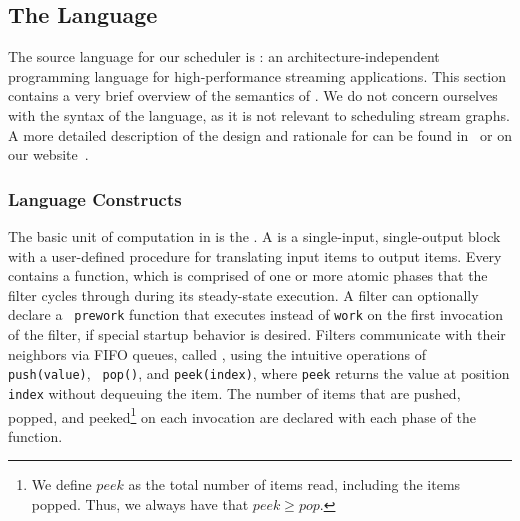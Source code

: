 \subsection{The {\StreamIt} Language}
\label{sec:streamit}

The source language for our scheduler is {\StreamIt}: an
architecture-independent programming language for high-performance
streaming applications.  This section contains a very brief overview
of the semantics of {\StreamIt}.  We do not concern ourselves with the
syntax of the language, as it is not relevant to scheduling stream
graphs. A more detailed description of the design and rationale for
{\StreamIt} can be found in~\cite{thies02streamit} or on our
website~\cite{streamitweb}.

\subsubsection{Language Constructs}

The basic unit of computation in {\StreamIt} is the {\filter}. A
{\filter} is a single-input, single-output block with a user-defined
procedure for translating input items to output items.  Every
{\filter} contains a {\work} function, which is comprised of one or
more atomic phases that the filter cycles through during its
steady-state execution. A filter can optionally declare a {\tt
prework} function that executes instead of {\tt work} on the first
invocation of the filter, if special startup behavior is desired.
Filters communicate with their neighbors via FIFO queues, called
{\Channels}, using the intuitive operations of {\tt push(value)}, {\tt
pop()}, and {\tt peek(index)}, where {\tt peek} returns the value at
position {\tt index} without dequeuing the item.  The number of items
that are pushed, popped, and peeked\footnote{{\small We define $peek$
as the total number of items read, including the items popped.  Thus,
we always have that $peek \ge pop$.}} on each invocation are declared
with each phase of the {\work} function.

